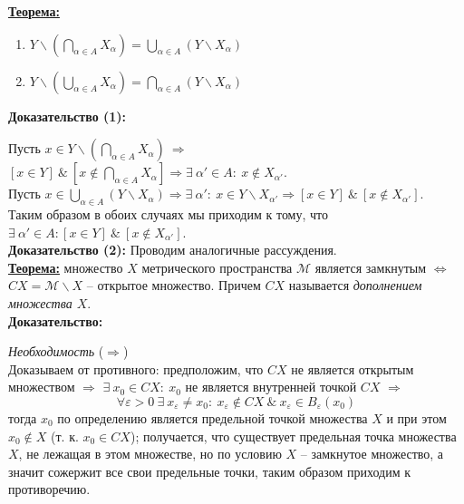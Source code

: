 \documentclass[a4paper,12pt]{article} %
\begin{document}
\underline{\textbf{Теорема:}}

\begin{enumerate}
    \item $Y \backslash (\bigcap \limits_{\alpha \in A} X_{\alpha}) = \bigcup \limits_{\alpha \in A} (Y \backslash X_{\alpha})$
    \item $Y \backslash (\bigcup \limits_{\alpha \in A} X_{\alpha}) = \bigcap \limits_{\alpha \in A} (Y \backslash X_{\alpha})$
\end{enumerate}

\textbf{Доказательство (1):} 

Пусть $x \in Y \backslash \left(\bigcap \limits_{\alpha \in A} X_{\alpha} \right) ~ \Rightarrow$ $[x \in Y] ~ \& ~ \left[x \notin \bigcap \limits_{\alpha \in A} X_{\alpha} \right] \Rightarrow \exists ~ \alpha' \in A : ~ x \notin X_{\alpha'}$.\\

Пусть $x \in \bigcup \limits_{\alpha \in A} (Y \backslash X_{\alpha}) \Rightarrow \exists ~ \alpha' : ~ x \in Y \backslash X_{\alpha'} \Rightarrow [x \in Y] ~ \& ~ [x \notin X_{\alpha'}]$.\\

Таким образом в обоих случаях мы приходим к тому, что $\exists ~ \alpha' \in A : [x \in Y] ~ \& ~ [x \notin X_{\alpha'}]$.\\

\textbf{Доказательство (2):} Проводим аналогичные рассуждения.\\

\underline{\textbf{Теорема:}} множество $X$ метрического пространства $\mathscr{M}$ является замкнутым $\Leftrightarrow$ $CX = \mathscr{M} \backslash X$ -- открытое множество. Причем $CX$ называется \textit{дополнением множества $X$}.\\

\textbf{Доказательство:} 

\textit{Необходимость} ($\Rightarrow$)\\

Доказываем от противного: предположим, что $CX$ не является открытым множеством $\Rightarrow$ $\exists ~ x_0 \in CX : ~ x_0$ не является внутренней точкой $CX$ $\Rightarrow$ 
\[\forall \varepsilon > 0 ~ \exists ~ x_{\varepsilon} \neq x_0 : ~ x_{\varepsilon} \notin CX ~ \& ~ x_{\varepsilon} \in B_{\varepsilon}(x_0)\]
тогда $x_0$ по определению является предельной точкой множества $X$ и при этом $x_0 \notin X$ (т. к. $x_0 \in CX$); получается, что существует предельная точка множества $X$, не лежащая в этом множестве, но по условию $X$ -- замкнутое множество, а значит сожержит все свои предельные точки, таким образом приходим к противоречию.\\
\end{document}
